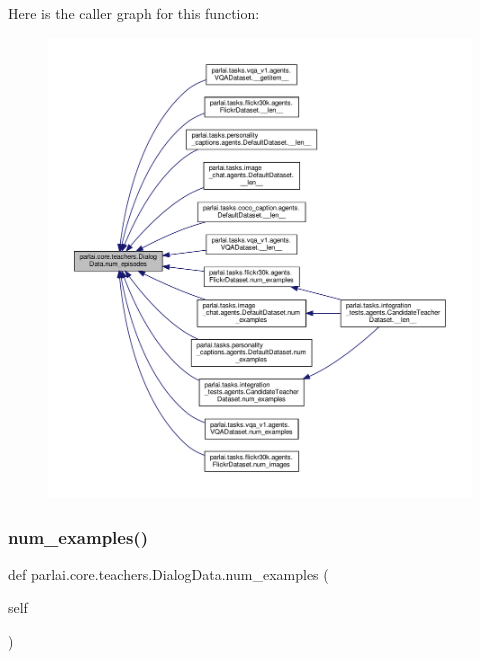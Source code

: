 Here is the caller graph for this function\+:
\nopagebreak
\begin{figure}[H]
\begin{center}
\leavevmode
\includegraphics[width=350pt]{classparlai_1_1core_1_1teachers_1_1DialogData_a83e3457f29a54ec455ad76f7eab6cfc4_icgraph}
\end{center}
\end{figure}
\mbox{\label{classparlai_1_1core_1_1teachers_1_1DialogData_a8deee9e9e45ae8162270bdcdfd7916b6}} 
\subsubsection{\texorpdfstring{num\+\_\+examples()}{num\_examples()}}
{\footnotesize\ttfamily def parlai.\+core.\+teachers.\+Dialog\+Data.\+num\+\_\+examples (\begin{DoxyParamCaption}\item[{}]{self }\end{DoxyParamCaption})}

